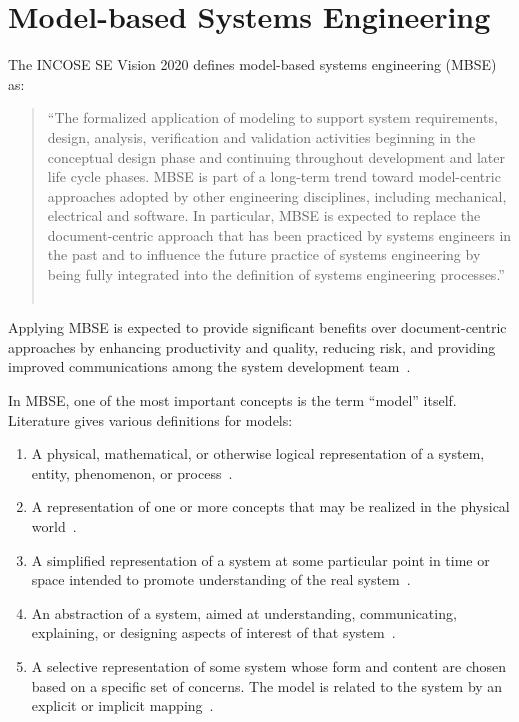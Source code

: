 \section{Model-based Systems Engineering}\label{sec:mbse}

The INCOSE SE Vision 2020 defines model-based systems engineering (MBSE) as:

\blockquote{``The formalized application of modeling to support system requirements, design, analysis, verification and validation activities beginning in the conceptual design phase and continuing throughout development and later life cycle phases. MBSE is part of a long-term trend toward model-centric approaches adopted by other engineering disciplines, including mechanical, electrical and software. In particular, MBSE is expected to replace the document-centric approach that has been practiced by systems engineers in the past and to influence the future practice of systems engineering by being fully integrated into the definition of systems engineering processes.'' ~\cite{incose-systems-engineering-2020}}

Applying MBSE is expected to provide significant benefits over document-centric approaches by enhancing productivity and quality, reducing risk, and providing improved communications among the system development team~\cite{omgwiki}.

In MBSE, one of the most important concepts is the term ``model'' itself. Literature gives various definitions for models:

\begin{enumerate}
	\item A physical, mathematical, or otherwise logical representation of a system, entity, phenomenon, or process~\cite{DoD_modeling_and_simulation}.\label{item:dod}
	\item A representation of one or more concepts that may be realized in the physical world~\cite{sysml_practical_guide}.
	\item A simplified representation of a system at some particular point in time or space intended to promote understanding of the real system~\cite{modsim}.
	\item An abstraction of a system, aimed at understanding, communicating, explaining, or designing aspects of interest of that system~\cite{object-process-methodology}.
	\item A selective representation of some system whose form and content are chosen based on a specific set of concerns. The model is related to the system by an explicit or implicit mapping~\cite{ORMSC/2010-09-06}.
\end{enumerate}

